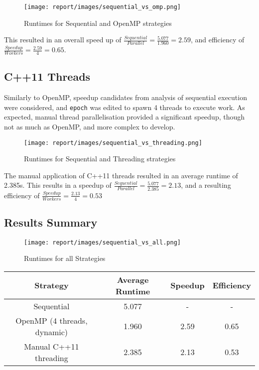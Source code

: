 \documentclass[a4paper]{article}
\begin{document}
            \begin{figure}[!h]
                \centering
                \texttt{[image: report/images/sequential\_vs\_omp.png]}
                \caption{Runtimes for Sequential and OpenMP strategies}
            \end{figure}

            This resulted in an overall speed up of $ \frac{Sequential}{Parallel} = \frac{5.077}{1.960} = 2.59 $,
            and efficiency of $ \frac{Speedup}{Workers} = \frac{2.59}{4} = 0.65 $.

        \subsection{C++11 Threads}
            Similarly to OpenMP, speedup candidates from analysis of sequential execution were considered, and
            \texttt{epoch} was edited to spawn 4 threads to execute work. As expected, manual thread parallelisation
            provided a significant speedup, though not as much as OpenMP, and more complex to develop.

            \begin{figure}[!h]
                \centering
                \texttt{[image: report/images/sequential\_vs\_threading.png]}
                \caption{Runtimes for Sequential and Threading strategies}
            \end{figure}

            The manual application of C++11 threads resulted in an average runtime of 2.385s.
            This results in a speedup of $ \frac{Sequential}{Parallel} = \frac{5.077}{2.385} = 2.13 $, and a resulting
            efficiency of $ \frac{Speedup}{Workers} = \frac{2.13}{4} = 0.53 $

        \subsection{Results Summary}
            \begin{figure}[!h]
                \centering
                \texttt{[image: report/images/sequential\_vs\_all.png]}
                \caption{Runtimes for all Strategies}
            \end{figure}

            \begin{minipage}{\textwidth}
                \centering
                \begin{tabular} { c c c c }
                    Strategy                    & Average Runtime & Speedup & Efficiency \\
                    \hline
                    \hline
                    Sequential                  & 5.077           & -       & -          \\
                    OpenMP (4 threads, dynamic) & 1.960           & 2.59    & 0.65       \\
                    Manual C++11 threading      & 2.385           & 2.13    & 0.53       \\
                \end{tabular}
            \end{minipage}
\end{document}
